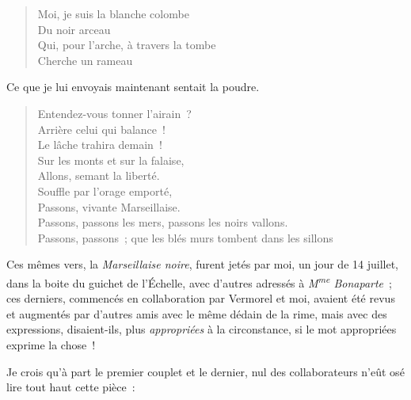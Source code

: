 \documentclass[french,twoside]{book} %
\begin{document}
\begin{verse}
Moi, je suis la blanche colombe\\
\hspace{1em}\hspace{1em}Du noir arceau\\
Qui, pour l’arche, à travers la tombe\\
\hspace{1em}\hspace{1em}Cherche un rameau\\
\end{verse}

\noindent Ce que je lui envoyais maintenant sentait la poudre.\par


\begin{verse}
\hspace{1em}\hspace{1em}Entendez-vous tonner l’airain ?\\
\hspace{1em}\hspace{1em}Arrière celui qui balance !\\
\hspace{1em}\hspace{1em}Le lâche trahira demain !\\
\hspace{1em}\hspace{1em}Sur les monts et sur la falaise,\\
\hspace{1em}\hspace{1em}Allons, semant la liberté.\\
\hspace{1em}\hspace{1em}Souffle par l’orage emporté,\\
\hspace{1em}\hspace{1em}Passons, vivante Marseillaise.\\
Passons, passons les mers, passons les noirs vallons.\\
Passons, passons ; que les blés murs tombent dans les sillons\\
\end{verse}

\noindent Ces mêmes vers, la \emph{Marseillaise noire}, furent jetés par moi, un jour de 14 juillet, dans la boite du guichet de l’Échelle, avec d’autres adressés à \emph{M\textsuperscript{me} Bonaparte} ; ces derniers, commencés en collaboration par Vermorel et moi, avaient été revus et augmentés par d’autres amis avec le même dédain de la rime, mais avec des expressions, disaient-ils, plus \emph{appropriées} à la circonstance, si le mot appropriées exprime la chose !\par
Je crois qu’à part le premier couplet et le dernier, nul des collaborateurs n’eût osé lire tout haut cette pièce :\par
 
\end{document}
